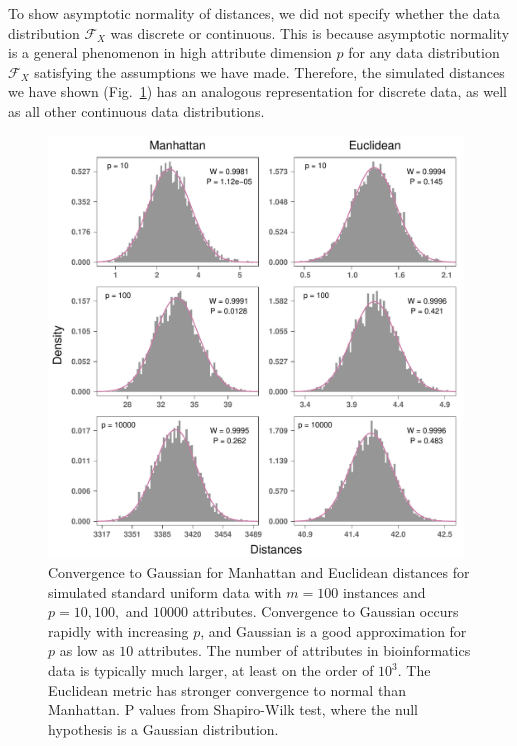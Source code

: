 \documentclass[aos]{imsart}
\begin{document}
To show asymptotic normality of distances, we did not specify whether the data distribution $\mathcal{F}_X$ was discrete or continuous. This is because asymptotic normality is a general phenomenon in high attribute dimension $p$ for any data distribution $\mathcal{F}_X$ satisfying the assumptions we have made. Therefore, the simulated distances we have shown (Fig.~\ref{fig:central_limit_convergence}) has an analogous representation for discrete data, as well as all other continuous data distributions.
%
%
\begin{figure}[H]
	\centering
	\includegraphics[width=0.98\textwidth]{central_limit_hist_uniform-data.pdf}
	\caption{Convergence to Gaussian for Manhattan and Euclidean distances for simulated standard uniform data with $m=100$ instances and $p=10, 100,$ and $10000$ attributes. Convergence to Gaussian occurs rapidly with increasing $p$, and Gaussian is a good approximation for $p$ as low as $10$ attributes. The number of attributes in bioinformatics data is typically much larger, at least on the order of $10^3$. The Euclidean metric has stronger convergence to normal than Manhattan.  P values from Shapiro-Wilk test, where the null hypothesis is a Gaussian distribution.}
	\label{fig:central_limit_convergence}
\end{figure}
\end{document}
